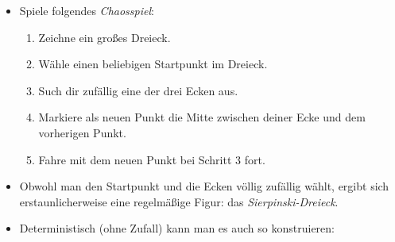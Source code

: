 \documentclass[a4paper,ngerman]{scrartcl}
\begin{document}
\begin{itemize}
  \item Spiele folgendes \emph{Chaosspiel}:
  \begin{enumerate}
    \item Zeichne ein großes Dreieck.
    \item Wähle einen beliebigen Startpunkt im Dreieck.
    \item Such dir zufällig eine der drei Ecken aus.
    \item Markiere als neuen Punkt die Mitte zwischen deiner Ecke und dem
    vorherigen Punkt.
    \item Fahre mit dem neuen Punkt bei Schritt 3 fort.
  \end{enumerate}
  \item Obwohl man den Startpunkt und die Ecken völlig zufällig wählt, ergibt
  sich erstaunlicherweise eine regelmäßige Figur: das \emph{Sierpinski-Dreieck}.
  \item Deterministisch (ohne Zufall) kann man es auch so konstruieren:


\end{itemize}
\end{document}
